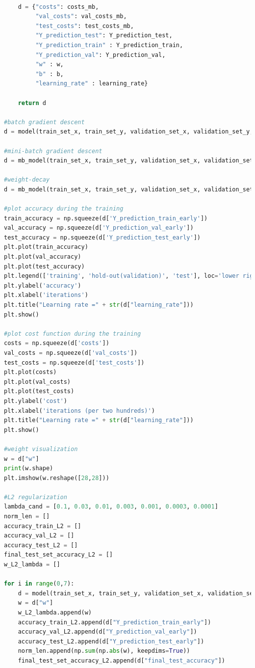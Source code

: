 \documentclass{article} %
\begin{document}
{\begin{lstlisting}[language=Python]
    
    d = {"costs": costs_mb,
         "val_costs": val_costs_mb,
         "test_costs": test_costs_mb,
         "Y_prediction_test": Y_prediction_test, 
         "Y_prediction_train" : Y_prediction_train,
         "Y_prediction_val": Y_prediction_val,
         "w" : w, 
         "b" : b,
         "learning_rate" : learning_rate}
    
    return d

#batch gradient descent
d = model(train_set_x, train_set_y, validation_set_x, validation_set_y, test_set_x, test_set_y, lambda_reg = 0, reg_type = 2, num_iterations = 5000, learning_rate = 0.01, print_cost = True, early_stopping = False)

#mini-batch gradient descent
d = mb_model(train_set_x, train_set_y, validation_set_x, validation_set_y, test_set_x, test_set_y, lambda_reg = 0, reg_type = 2, batch_size = int(0.1*train_set_x.shape[1]), num_epoch = 500, learning_rate = 0.005, T = 2, print_cost = True, weight_decay = False)

#weight-decay
d = mb_model(train_set_x, train_set_y, validation_set_x, validation_set_y, test_set_x, test_set_y, lambda_reg = 0, batch_size = 500, num_epoch = 100, learning_rate = 0.01, T = 10, print_cost = True, weight_decay = True)

#plot accuracy during the training
train_accuracy = np.squeeze(d['Y_prediction_train_early'])
val_accuracy = np.squeeze(d['Y_prediction_val_early'])
test_accuracy = np.squeeze(d['Y_prediction_test_early'])
plt.plot(train_accuracy)
plt.plot(val_accuracy)
plt.plot(test_accuracy)
plt.legend(['training', 'hold-out(validation)', 'test'], loc='lower right')
plt.ylabel('accuracy')
plt.xlabel('iterations')
plt.title("Learning rate =" + str(d["learning_rate"]))
plt.show()

#plot cost function during the training
costs = np.squeeze(d['costs'])
val_costs = np.squeeze(d['val_costs'])
test_costs = np.squeeze(d['test_costs'])
plt.plot(costs)
plt.plot(val_costs)
plt.plot(test_costs)
plt.ylabel('cost')
plt.xlabel('iterations (per two hundreds)')
plt.title("Learning rate =" + str(d["learning_rate"]))
plt.show()

#weight visualization
w = d["w"]
print(w.shape)
plt.imshow(w.reshape([28,28]))

#L2 regularization
lambda_cand = [0.1, 0.03, 0.01, 0.003, 0.001, 0.0003, 0.0001]
norm_len = []
accuracy_train_L2 = []
accuracy_val_L2 = []
accuracy_test_L2 = []
final_test_set_accuracy_L2 = []
w_L2_lambda = []

for i in range(0,7):
    d = model(train_set_x, train_set_y, validation_set_x, validation_set_y, test_set_x, test_set_y, lambda_reg = lambda_cand[i], reg_type = 2, num_iterations = 5000, learning_rate = 0.005, print_cost = False, early_stopping = True)
    w = d["w"]
    w_L2_lambda.append(w)
    accuracy_train_L2.append(d["Y_prediction_train_early"])
    accuracy_val_L2.append(d["Y_prediction_val_early"])
    accuracy_test_L2.append(d["Y_prediction_test_early"])
    norm_len.append(np.sum(np.abs(w), keepdims=True))
    final_test_set_accuracy_L2.append(d["final_test_accuracy"])


\end{lstlisting}}
\end{document}
